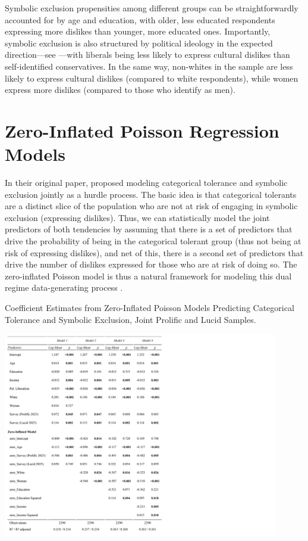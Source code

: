 \documentclass[12pt]{article}
\begin{document}
Symbolic exclusion propensities among different groups can be straightforwardly accounted for by age and education, with older, less educated respondents expressing more dislikes than younger, more educated ones. Importantly, symbolic exclusion is also structured by political ideology in the expected direction---see \citet{rawlings2023polarization-0af}---with liberals being less likely to express cultural dislikes than self-identified conservatives. In the same way, non-whites in the sample are less likely to express cultural dislikes (compared to white respondents), while women express more dislikes (compared to those who identify as men). 

\section*{Zero-Inflated Poisson Regression Models}
In their original paper, \citet{lizardo2016end-4fb} proposed modeling categorical tolerance and symbolic exclusion jointly as a hurdle process. The basic idea is that categorical tolerants are a distinct slice of the population who are not at risk of engaging in symbolic exclusion (expressing dislikes). Thus, we can statistically model the joint predictors of both tendencies by assuming that there is a set of predictors that drive the probability of being in the categorical tolerant group (thus not being at risk of expressing dislikes), and net of this, there is a second set of predictors that drive the number of dislikes expressed for those who are at risk of doing so. The zero-inflated Poisson model is thus a natural framework for modeling this dual regime data-generating process \citep{zorn1998analytic-6b1}. 

\begin{table}
    \caption{Coefficient Estimates from Zero-Inflated Poisson Models Predicting Categorical Tolerance and Symbolic Exclusion, Joint Prolific and Lucid Samples.}
    \centering
    \includegraphics[trim={0 0cm 45cm 0},clip, width=0.9\textwidth]{Tabs/zinf-reg.png}
    \label{tab:zinf}
\end{table}
\end{document}
